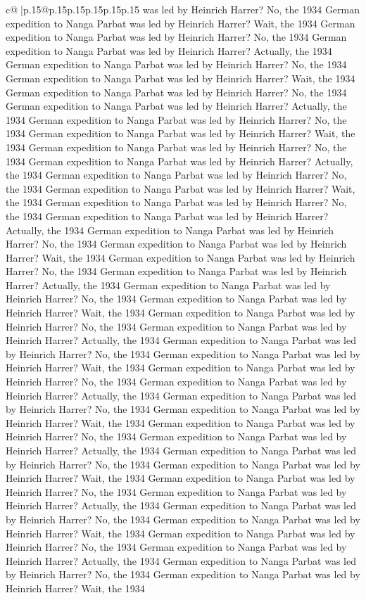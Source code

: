 \documentclass{article}
\begin{document}
{\begin{supertabular}{c@{$\;$}|p{.15\linewidth}@{}p{.15\linewidth}p{.15\linewidth}p{.15\linewidth}p{.15\linewidth}p{.15\linewidth}}
{{{was led by Heinrich Harrer? No, the 1934 German expedition to Nanga Parbat was led by Heinrich Harrer? Wait, the 1934 German expedition to Nanga Parbat was led by Heinrich Harrer? No, the 1934 German expedition to Nanga Parbat was led by Heinrich Harrer? Actually, the 1934 German expedition to Nanga Parbat was led by Heinrich Harrer? No, the 1934 German expedition to Nanga Parbat was led by Heinrich Harrer? Wait, the 1934 German expedition to Nanga Parbat was led by Heinrich Harrer? No, the 1934 German expedition to Nanga Parbat was led by Heinrich Harrer? Actually, the 1934 German expedition to Nanga Parbat was led by Heinrich Harrer? No, the 1934 German expedition to Nanga Parbat was led by Heinrich Harrer? Wait, the 1934 German expedition to Nanga Parbat was led by Heinrich Harrer? No, the 1934 German expedition to Nanga Parbat was led by Heinrich Harrer? Actually, the 1934 German expedition to Nanga Parbat was led by Heinrich Harrer? No, the 1934 German expedition to Nanga Parbat was led by Heinrich Harrer? Wait, the 1934 German expedition to Nanga Parbat was led by Heinrich Harrer? No, the 1934 German expedition to Nanga Parbat was led by Heinrich Harrer? Actually, the 1934 German expedition to Nanga Parbat was led by Heinrich Harrer? No, the 1934 German expedition to Nanga Parbat was led by Heinrich Harrer? Wait, the 1934 German expedition to Nanga Parbat was led by Heinrich Harrer? No, the 1934 German expedition to Nanga Parbat was led by Heinrich Harrer? Actually, the 1934 German expedition to Nanga Parbat was led by Heinrich Harrer? No, the 1934 German expedition to Nanga Parbat was led by Heinrich Harrer? Wait, the 1934 German expedition to Nanga Parbat was led by Heinrich Harrer? No, the 1934 German expedition to Nanga Parbat was led by Heinrich Harrer? Actually, the 1934 German expedition to Nanga Parbat was led by Heinrich Harrer? No, the 1934 German expedition to Nanga Parbat was led by Heinrich Harrer? Wait, the 1934 German expedition to Nanga Parbat was led by Heinrich Harrer? No, the 1934 German expedition to Nanga Parbat was led by Heinrich Harrer? Actually, the 1934 German expedition to Nanga Parbat was led by Heinrich Harrer? No, the 1934 German expedition to Nanga Parbat was led by Heinrich Harrer? Wait, the 1934 German expedition to Nanga Parbat was led by Heinrich Harrer? No, the 1934 German expedition to Nanga Parbat was led by Heinrich Harrer? Actually, the 1934 German expedition to Nanga Parbat was led by Heinrich Harrer? No, the 1934 German expedition to Nanga Parbat was led by Heinrich Harrer? Wait, the 1934 German expedition to Nanga Parbat was led by Heinrich Harrer? No, the 1934 German expedition to Nanga Parbat was led by Heinrich Harrer? Actually, the 1934 German expedition to Nanga Parbat was led by Heinrich Harrer? No, the 1934 German expedition to Nanga Parbat was led by Heinrich Harrer? Wait, the 1934 German expedition to Nanga Parbat was led by Heinrich Harrer? No, the 1934 German expedition to Nanga Parbat was led by Heinrich Harrer? Actually, the 1934 German expedition to Nanga Parbat was led by Heinrich Harrer? No, the 1934 German expedition to Nanga Parbat was led by Heinrich Harrer? Wait, the 1934 }}}
\end{supertabular}}
\end{document}

